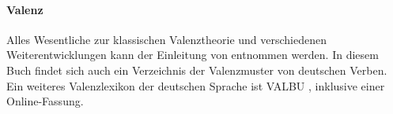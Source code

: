 {\begin{sloppypar}
\paragraph*{Valenz}

Alles Wesentliche zur klassischen Valenztheorie und verschiedenen Weiterentwicklungen kann der Einleitung von \citet{HelbigSchenkel1991} entnommen werden.
In diesem Buch findet sich auch ein Verzeichnis der Valenzmuster von deutschen Verben.
Ein weiteres Valenzlexikon der deutschen Sprache ist VALBU \citep{SchumacherEa2004}, inklusive einer Online-Fassung.

\end{sloppypar}

}
